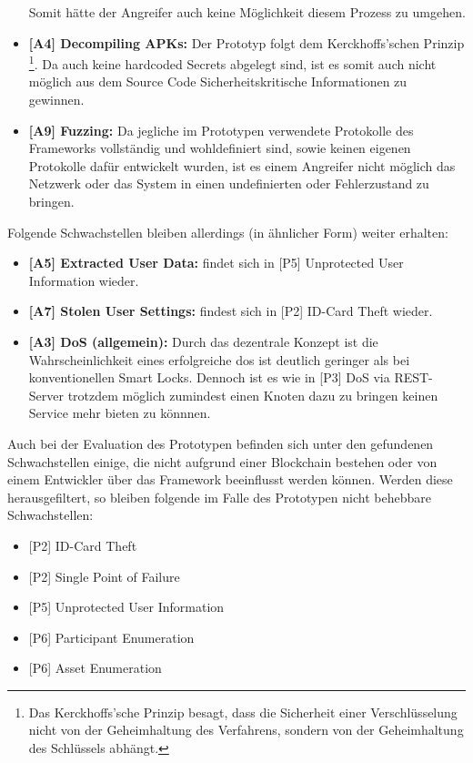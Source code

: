 \begin{itemize}[leftmargin=0cm,label={}]
        Somit hätte der Angreifer auch keine Möglichkeit diesem Prozess zu umgehen.
        \item \textbf{[A4] Decompiling APKs:} Der Prototyp folgt dem Kerckhoffs'schen Prinzip
        \!\footnote{Das Kerckhoffs'sche Prinzip besagt, dass die Sicherheit einer Verschlüsselung nicht von der Geheimhaltung des Verfahrens, sondern von der Geheimhaltung des Schlüssels abhängt.}. 
        Da auch keine hardcoded Secrets abgelegt sind, ist es somit auch nicht möglich aus dem Source Code Sicherheitskritische Informationen zu gewinnen.
        \item \textbf{[A9] Fuzzing:} Da jegliche im Prototypen verwendete Protokolle des Frameworks vollständig und wohldefiniert sind, sowie keinen eigenen Protokolle dafür entwickelt wurden, ist es einem Angreifer nicht möglich das Netzwerk oder das System in einen undefinierten oder Fehlerzustand zu bringen.
    \end{itemize}
    \bigskip
    Folgende Schwachstellen bleiben allerdings (in ähnlicher Form) weiter erhalten:
    \begin{itemize}[leftmargin=0cm,label={}]
        \item \textbf{[A5] Extracted User Data:} findet sich in [P5] Unprotected User Information wieder.
        \item \textbf{[A7] Stolen User Settings:} findest sich in [P2] ID-Card Theft wieder.
        \item \textbf{[A3] DoS (allgemein):} Durch das dezentrale Konzept ist die Wahrscheinlichkeit eines erfolgreiche \gls{dos} ist deutlich geringer als bei konventionellen Smart Locks. 
        Dennoch ist es wie in [P3] DoS via REST-Server trotzdem möglich zumindest einen Knoten dazu zu bringen keinen Service mehr bieten zu könnnen.
    \end{itemize}
    \bigskip
    Auch bei der Evaluation des Prototypen befinden sich unter den gefundenen Schwachstellen einige, die nicht aufgrund einer Blockchain bestehen oder von einem Entwickler über das Framework beeinflusst werden können. 
    Werden diese herausgefiltert, so bleiben folgende im Falle des Prototypen nicht behebbare Schwachstellen:
    \begin{itemize}[noitemsep]
        \item {[P2]} ID-Card Theft
        \item {[P2]} Single Point of Failure
        \item {[P5]} Unprotected User Information
        \item {[P6]} Participant Enumeration
        \item {[P6]} Asset Enumeration
    \end{itemize}
    